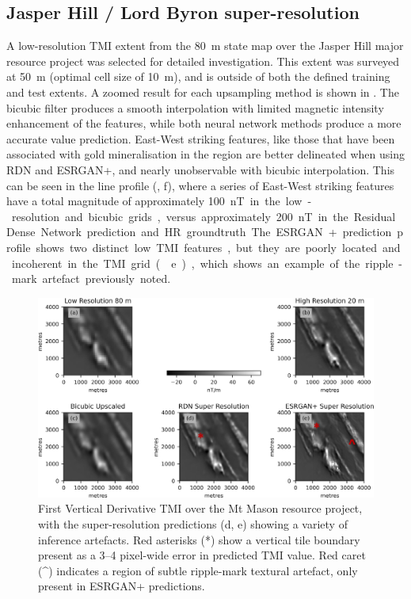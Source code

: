 \documentclass[manuscript.tex]{subfiles}
\begin{document}
\subsection{Jasper Hill / Lord Byron super-resolution}
A low-resolution TMI extent from the \qty{80}{\metre} state map over the Jasper Hill major resource project was selected for detailed investigation.
This extent was surveyed at \qty{50}{\metre} (optimal cell size of \qty{10}{\metre}), and is outside of both the defined training and test extents.
A zoomed result for each upsampling method is shown in .
The bicubic filter produces a smooth interpolation with limited magnetic intensity enhancement of the features, while both neural network methods produce a more accurate value prediction.
East-West striking features, like those that have been associated with gold mineralisation in the region \parencite[p.~283]{salierTimingSourceGoldbearing2003} are better delineated when using RDN\textdaggerdbl{} and ESRGAN+, and nearly unobservable with bicubic interpolation.
This can be seen in the line profile (, f), where a series of East-West striking features have a total magnitude of approximately \qty{100}nT in the low-resolution and bicubic grids, versus approximately \qty{200}nT in the Residual Dense Network prediction and HR groundtruth.
The ESRGAN+ prediction profile shows two distinct low TMI features, but they are poorly located and incoherent in the TMI grid ( e), which shows an example of the ripple-mark artefact previously noted.

\begin{figure}[hbt]
    \includegraphics[width=\linewidth,trim={0 0 0 0},clip]{fig/p1/jhillvis.jpg}
    \caption[First Vertical Derivative SR TMI over the Mt Mason resource project]{First Vertical Derivative TMI over the Mt Mason resource project, with the super-resolution predictions (d, e) showing a variety of inference artefacts.
    Red asterisks (*) show a vertical tile boundary present as a 3--4 pixel-wide error in predicted TMI value.
    Red caret (\^{ }) indicates a region of subtle ripple-mark textural artefact, only present in ESRGAN+ predictions.
    }
    \label{fig:jhillvis}
\end{figure}
\end{document}
